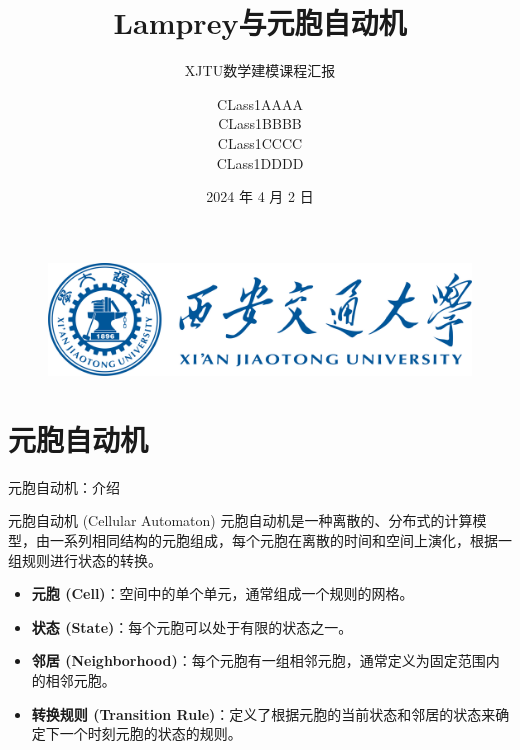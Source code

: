 \documentclass{beamer}
\author[XJTU数学建模课程汇报]{CLass1\hspace{0.1cm}AAAA\\
CLass1\hspace{0.1cm}BBBB\\
CLass1\hspace{0.1cm}CCCC\\
CLass1\hspace{0.1cm}DDDD}
\title{Lamprey与元胞自动机}
\subtitle{XJTU数学建模课程汇报}
\date{2024 年 4 月 2 日}
\institute{Team. 26}
\begin{document}
\kaishu
\begin{frame}
    \titlepage

    \begin{figure}[htpb]
        \begin{center}
            \includegraphics[width=0.3\linewidth]{pic/title.png}
        \end{center}
    \end{figure}
\end{frame}

\begin{frame}
\tableofcontents[sectionstyle=show,subsectionstyle=show/shaded/hide,subsubsectionstyle=show/shaded/hide]
\end{frame}



\section{元胞自动机}

\begin{frame}{元胞自动机：介绍}
    
    \begin{block}{元胞自动机 (Cellular Automaton)}
        元胞自动机是一种离散的、分布式的计算模型，由一系列相同结构的元胞组成，每个元胞在离散的时间和空间上演化，根据一组规则进行状态的转换。
    \end{block}
    
    \begin{itemize}
        \item \textbf{元胞 (Cell)}：空间中的单个单元，通常组成一个规则的网格。
        \item \textbf{状态 (State)}：每个元胞可以处于有限的状态之一。
        \item \textbf{邻居 (Neighborhood)}：每个元胞有一组相邻元胞，通常定义为固定范围内的相邻元胞。
        \item \textbf{转换规则 (Transition Rule)}：定义了根据元胞的当前状态和邻居的状态来确定下一个时刻元胞的状态的规则。
    \end{itemize}

\end{frame}
\end{document}

